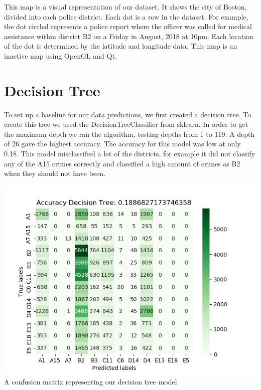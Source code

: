 \documentclass[a0,landscape]{a0poster}
\let\Section=\section
\def\section{\setcounter{equation}{0}\Section}
\newcommand{\1}{\bold{1}}
\begin{document}
\begin{multicols}{3}
\begin{center}
    This map is a visual representation of our dataset. It shows the city of Boston, divided into each police district. Each dot is a row in the dataset. For example, the dot circled represents a police report where the officer was called for medical assistance within district B2 on a Friday in August, 2018 at 10pm. Each location of the dot is determined by the latitude and longitude data. This map is an inactive map using OpenGL and Qt.
\end{center}
\section{Decision Tree}
To set up a baseline for our data predictions, we first created a decision tree. To create this tree we used the DecisionTreeClassifier from sklearn. In order to get the maximum depth we ran the algorithm, testing depths from 1 to 119. A depth of 26 gave the highest accuracy. The accuracy for this model was low at only 0.18. This model misclassified a lot of the districts, for example it did not classify any of the A15 crimes correctly and classified a high amount of crimes as B2 when they should not have been.

\begin{center}
    \includegraphics[scale = 2]{decision_tree_cm.png} \\
    A confusion matrix representing our decision tree model
\end{center}


\end{multicols}
\end{document}
